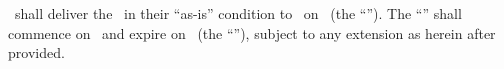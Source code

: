 \lessor\ shall deliver the \property\ in their “as-is” condition to \lessee\ on \deliverydatedate\ (the “\deliverydate”). The “\termoflease” shall commence on \deliverydate\ and expire on \expdatedate\ (the “\expdate”), subject to any extension as herein after provided.
